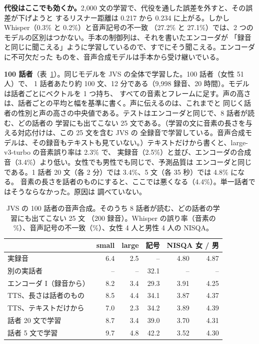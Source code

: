 \documentclass[10pt,a4paper,twocolumn]{article}
\begin{document}
\textbf{代役はここでも効くか。}2,000 文の学習で、代役を通した誤差を外すと、その誤差が下げようと
するリスナー距離は 0.217 から 0.234 に上がる。しかし Whisper（0.3\% と 0.2\%）と音声記号の不一致
（27.2\% と 27.1\%）では、2 つのモデルの区別はつかない。手本の制御列は、それを書いたエンコーダが
「録音と同じに聞こえる」ように学習しているので、すでにそう聞こえる。エンコーダに不可欠だった
ものを、音声合成モデルは手本から受け継いでいる。

\textbf{100 話者}（表~\ref{tab:many}）。同じモデルを JVS の全体で学習した。100 話者（女性 51 人）で、
1 話者あたり約 100 文、12 分である（9,998 録音、20 時間）。モデルは話者ごとにベクトルを 1 つ持ち、
すべての音素とフレームに足す。声の高さは、話者ごとの平均と幅を基準に書く。声に伝えるのは、これまでと
同じく話者の性別と声の高さの中央値である。テストはエンコーダと同じで、8 話者が読む、どの話者の
学習にも出てこない 25 文である。（学習の文に音素の長さを与える対応付けは、この 25 文を含む JVS の
全録音で学習している。音声合成モデルは、その録音もテキストも見ていない。）テキストだけから書くと、large-v3-turbo の音素誤り率は 2.3\% で、
実録音（2.5\%）と並び、エンコーダの合成音（3.4\%）より低い。女性でも男性でも同じで、予測品質は
エンコーダと同じである。1 話者 20 文（各 2 分）では 3.4\%、5 文（各 35 秒）では 4.8\% になる。
音素の長さを話者のものにすると、ここでは悪くなる（4.4\%）。単一話者ではそうならなかった。原因は
調べていない。

\begin{table}[t]
\centering\footnotesize\setlength{\tabcolsep}{2.6pt}
\caption{JVS の 100 話者の音声合成。そのうち 8 話者が読む、どの話者の学習にも出てこない 25 文
（200 録音）。Whisper の誤り率（音素の \%）、音声記号の不一致（\%）、女性 4 人と男性 4 人の NISQA。}
\label{tab:many}
\begin{tabular}{@{}lrrrrr@{}}
\toprule
& small & large & 記号 & \multicolumn{2}{c}{NISQA 女 / 男}\\
\midrule
実録音 & 6.4 & 2.5 & -- & 4.80 & 4.87\\
別の実話者 & -- & -- & 32.1 & -- & --\\
エンコーダ I（録音から） & 8.2 & 3.4 & 29.3 & 3.91 & 4.25\\
TTS、長さは話者のもの & 8.5 & 4.4 & 34.1 & 3.87 & 4.37\\
TTS、テキストだけから & 7.0 & 2.3 & 34.2 & 3.89 & 4.39\\
\quad 1 話者 20 文で学習 & 8.7 & 3.4 & 39.0 & 3.70 & 4.31\\
\quad 1 話者 5 文で学習 & 9.7 & 4.8 & 42.2 & 3.52 & 4.30\\
\bottomrule
\end{tabular}
\end{table}
\end{document}
